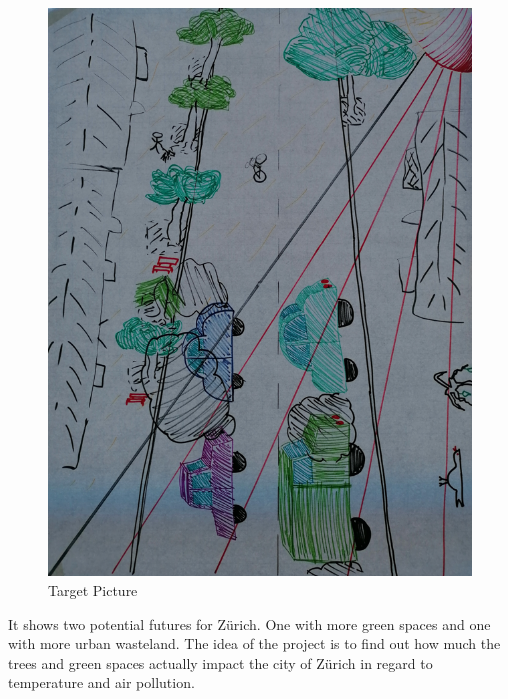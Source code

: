 \documentclass[
]{article}
\begin{document}
\begin{figure}
\centering
\includegraphics{../images/trees_vs_Pollution.png}
\caption{Target Picture}
\end{figure}

It shows two potential futures for Zürich. One with more green spaces
and one with more urban wasteland. The idea of the project is to find
out how much the trees and green spaces actually impact the city of
Zürich in regard to temperature and air pollution.
\end{document}
